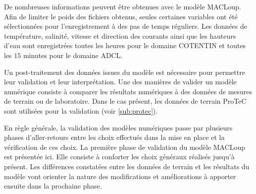 \documentclass[10pt,a4paper,titlepage]{article}
\begin{document}




De nombreuses informations peuvent être obtenues avec le modèle MACLoup.
Afin de limiter le poids des fichiers obtenus, seules certaines variables ont été sélectionnées pour l'enregistrement à des pas de temps réguliers.
Les données de température, salinité, vitesse et direction des courants ainsi que les hauteurs d'eau sont enregistrées toutes les heures pour le domaine COTENTIN et toutes les $15$ minutes pour le domaine ADCL.

Un post-traitement des données issues du modèle est nécessaire pour permettre leur validation et leur interprétation.
Une des manières de valider un modèle numérique consiste à comparer les résultats numériques à des données de mesures de terrain ou de laboratoire.
Dans le cas présent, les données de terrain ProTeC sont utilisées pour la validation (voir \ref{sub:protec}).

En règle générale, la validation des modèles numériques passe par plusieurs phases d'aller-retours entre les choix effectués dans la mise en place et la vérification de ces choix.
La première phase de validation du modèle MACLoup est présentée ici.
Elle consiste à conforter les choix généraux réalisés jusqu'à présent.
Les différences constatées entre les données de terrain et les résultats du modèle vont orienter la nature des modifications et améliorations à apporter ensuite dans la prochaine phase.

\end{document}
